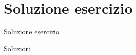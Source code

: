 \section{Soluzione esercizio}
  \begin{frame}{Soluzione esercizio}

    \begin{exampleblock}{Soluzioni}
      
    \end{exampleblock}

\end{frame}
